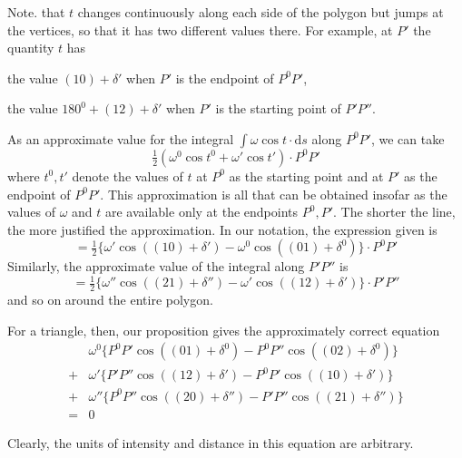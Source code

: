 Note. that $t$ changes continuously along each side of the polygon but jumps at the vertices, so that it has two different values there. For example, at $P'$ the quantity $t$ has

the value $(10)+\delta'$ when $P'$ is the endpoint of $P^0P'$,

the value $180^0+(12)+\delta'$ when $P'$ is the starting point of $P'P''$.

As an approximate value for the integral $\int\omega\cos t\cdot\mathrm{d}s$ along $P^0P'$, we can take
\[
\tfrac12(\omega^0\cos t^0+\omega'\cos t')\cdot P^0P'
\]
where $t^0,t'$ denote the values of $t$ at $P^0$ as the starting point and at $P'$ as the endpoint of $P^0P'$. This approximation is all that can be obtained insofar as the values of $\omega$ and $t$ are available only at the endpoints $P^0,P'$. The shorter the line, the more justified the approximation. In our notation, the expression given is
\[
=\tfrac12\{\omega'\cos((10)+\delta')-\omega^0\cos((01)+\delta^0)\}\cdot P^0P'
\]
Similarly, the approximate value of the integral along $P'P''$ is
\[
=\tfrac12\{\omega''\cos((21)+\delta'')-\omega'\cos((12)+\delta')\}\cdot P'P''
\]
and so on around the entire polygon.

For a triangle, then, our proposition gives the approximately correct equation
\[
\begin{aligned}
&\omega^0\{P^0P'\cos((01)+\delta^0)-P^0P''\cos((02)+\delta^0)\}\\
{}+{}&\omega'\{P'P''\cos((12)+\delta')-P^0P'\cos((10)+\delta')\}\\
{}+{}&\omega''\{P^0P''\cos((20)+\delta'')-P'P''\cos((21)+\delta'')\}\\
={}&0
\end{aligned}
\]

Clearly, the units of intensity and distance in this equation are arbitrary.

